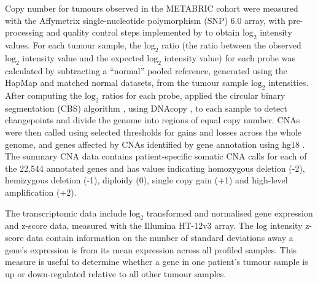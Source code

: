 Copy number for tumours observed in the METABRIC cohort were measured with the Affymetrix single-nucleotide polymorphism (SNP) 6.0 array, with pre-processing and quality control steps implemented by \cite{pmid22522925} to obtain $\text{log}_2$ intensity values. For each tumour sample, the $\text{log}_2$ ratio (the ratio between the observed $\text{log}_2$ intensity value and the expected $\text{log}_2$ intensity value) for each probe was calculated by subtracting a “normal” pooled reference, generated using the HapMap \citep{pmid14685227} and matched normal datasets, from the tumour sample $\text{log}_2$ intensities. After computing the $\text{log}_2$ ratios for each probe, \cite{pmid22522925} applied the circular binary segmentation (CBS) algorithm \citep{pmid15475419, pmid17234643}, using DNAcopy \citep{DNAcopy}, to each sample to detect changepoints and divide the genome into regions of equal copy number. CNAs were then called using selected thresholds for gains and losses across the whole genome, and genes affected by CNAs identified by gene annotation using hg18 \citep{pmid22522925}. The summary CNA data contains patient-specific somatic CNA calls for each of the 22,544 annotated genes and has values indicating homozygous deletion (-2), hemizygous deletion (-1), diploidy (0), single copy gain (+1) and high-level amplification (+2).  
 
The transcriptomic data include $\text{log}_2$ transformed and normalised gene expression and z-score data, measured with the Illumina HT-12v3 array. The log intensity z-score data contain information on the number of standard deviations away a gene's expression is from its mean expression across all profiled samples. This measure is useful to determine whether a gene in one patient's tumour sample is up or down-regulated relative to all other tumour samples.   

